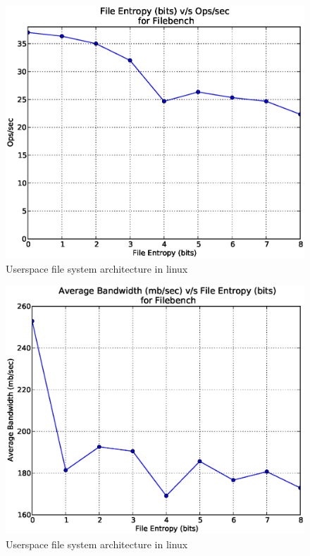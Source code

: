 \begin{figure}
\label{fig:fuse}
\begin{center}
\includegraphics[scale=.55]{../results/write_ops_avg.eps}
\caption{Userspace file system architecture in linux\cite{web:wiki-fuse}}
\end{center}
\end{figure}

\begin{figure}
\label{fig:fuse}
\begin{center}
\includegraphics{../results/read_bw.eps}
\caption{Userspace file system architecture in linux\cite{web:wiki-fuse}}
\end{center}
\end{figure}

